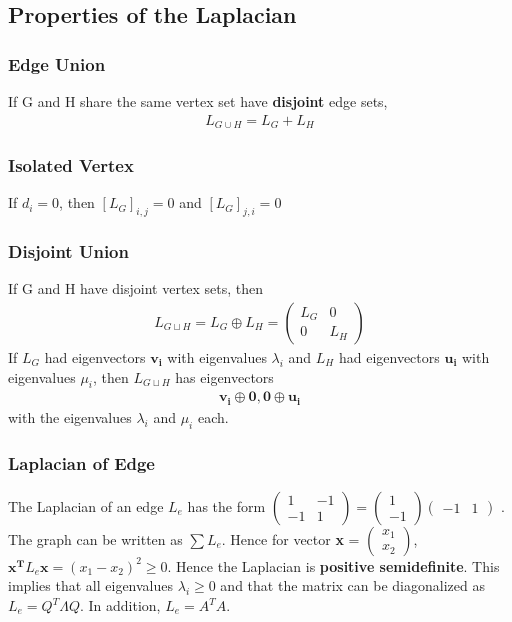 \documentclass[12pt, letterpaper]{report}
\begin{document}
    \subsection{Properties of the Laplacian}
    \subsubsection{Edge Union} If G and H share the same vertex set have \textbf{disjoint} edge sets,
    \begin{gather*}
        L_{G \cup H} = L_G + L_H
    \end{gather*}
    \subsubsection{Isolated Vertex} If $d_i = 0$, then $[L_G]_{i,j} = 0$ and $[L_G]_{j,i} = 0$\\
    \subsubsection{Disjoint Union} If G and H have disjoint vertex sets, then
    \begin{gather*}
        L_{G \sqcup H} = L_G \oplus L_H = 
        \begin{pmatrix}
            L_G & 0\\
            0 & L_H
        \end{pmatrix}
    \end{gather*}
    If $L_G$ had eigenvectors $\mathbf{v_i}$ with eigenvalues $\lambda_i$ and $L_H$ had eigenvectors $\mathbf{u_i}$ with eigenvalues $\mu_i$, then $L_{G \sqcup H}$ has eigenvectors
    \begin{gather*}
        \mathbf{v_i}\oplus \mathbf{0}, \mathbf{0}\oplus \mathbf{u_i}
    \end{gather*}
    with the eigenvalues $\lambda_i$ and $\mu_i$ each.
    \subsubsection{Laplacian of Edge}
    The Laplacian of an edge $L_e$ has the form $\begin{pmatrix}
        1 & -1\\
        -1 & 1
    \end{pmatrix} = \begin{pmatrix}
        1\\-1
    \end{pmatrix}\begin{pmatrix}
        -1 & 1
    \end{pmatrix}$
    . The graph can be written as $\sum L_e$. Hence for vector \textbf{x} = $\begin{pmatrix}
        x_{1} \\
        x_{2}
    \end{pmatrix}$, $\mathbf{x^T} L_e \mathbf{x} = (x_1 - x_2)^2 \geq 0$. Hence the Laplacian is \textbf{positive semidefinite}. 
    This implies that all eigenvalues $\lambda_i \geq 0$ and that the matrix can be diagonalized as $L_e = Q^T \Lambda Q$.
    In addition, $L_e = A^T A$.
\end{document}
